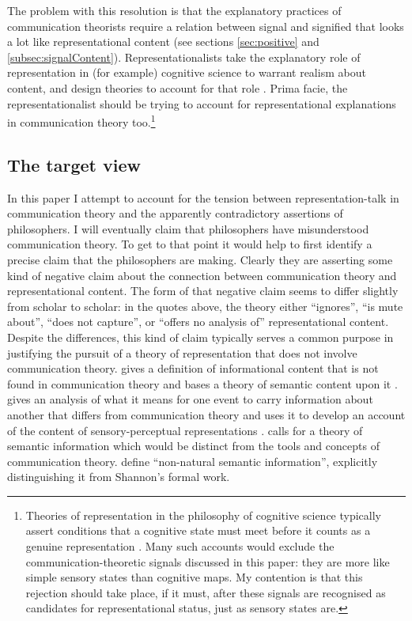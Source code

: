 \documentclass[12pt]{article}
\begin{document}
The problem with this resolution is that the explanatory practices of communication theorists require a relation between signal and signified that looks a lot like representational content (see sections \ref{sec:positive} and \ref{subsec:signalContent}).
Representationalists take the explanatory role of representation in (for example) cognitive science to warrant realism about content, and design theories to 
account for that role \citep{burge2010origins,shea2018representation}.
Prima facie, the representationalist should be trying to account for representational explanations in communication theory too.\footnote{Theories of representation in the philosophy of cognitive science typically assert conditions that a cognitive state must meet before it counts as a genuine representation \citep{shea2018representation,burge2010origins,piccinini2020nonnatural,desouzafilho2022dual}. Many such accounts would exclude the communication-theoretic signals discussed in this paper: they are more like simple sensory states than cognitive maps. My contention is that this rejection should take place, if it must, after these signals are recognised as candidates for representational status, just as sensory states are.}

\subsection{The target view}

In this paper I attempt to account for the tension between representation-talk in communication theory and the apparently contradictory assertions of philosophers.
I will eventually claim that philosophers have misunderstood communication theory.
To get to that point it would help to first identify a precise claim that the philosophers are making.
Clearly they are asserting some kind of negative claim about the connection between communication theory and representational content.
The form of that negative claim seems to differ slightly from scholar to scholar: in the quotes above, the theory either ``ignores'', ``is mute about'', ``does not capture'', or ``offers no analysis of'' representational content.
Despite the differences, this kind of claim typically serves a common purpose in justifying the pursuit of a theory of representation that does not involve communication theory.
\citet[65]{dretske1981knowledge} gives a definition of informational content that is not found in communication theory and bases a theory of semantic content upon it \citep[$\S7$]{dretske1981knowledge}.
\citet[142]{neander2017mark} gives an analysis of what it means for one event to carry information about another that differs from communication theory and uses it to develop an account of the content of sensory-perceptual representations \citep[$\S\S$7-9]{neander2017mark}.
\citet[$\S$6]{dennett2017bacteria} calls for a theory of semantic information which would be distinct from the tools and concepts of communication theory.
\citet[$\S$4.2.2]{piccinini2011information} define ``non-natural semantic information'', explicitly distinguishing it from Shannon's formal work.
\end{document}
